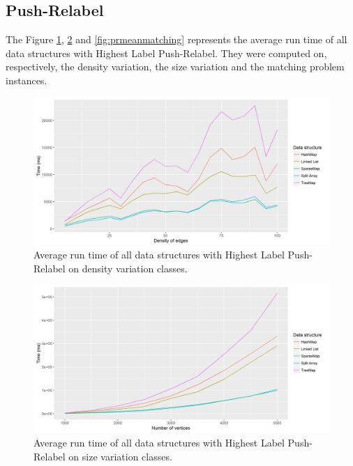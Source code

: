 \subsection{Push-Relabel}	
The Figure \ref{fig:prmeandensity}, \ref{fig:prmeansize} and \ref{fig:prmeanmatching} represents the average run time of all data structures with Highest Label Push-Relabel. They were computed on, respectively, the density variation, the size variation and the matching problem instances.
\begin{figure}[H]
\begin{center}
\includegraphics[scale=0.63]{images/results/prmeandensity.png}
\caption{Average run time of all data structures with Highest Label Push-Relabel on density variation classes.}
\label{fig:prmeandensity}
\end{center}
\end{figure}
\begin{figure}[H]
\begin{center}
\includegraphics[scale=0.6]{images/results/prmeansize.png}
\caption{Average run time of all data structures with Highest Label Push-Relabel on size variation classes.}
\label{fig:prmeansize}
\end{center}
\end{figure}
